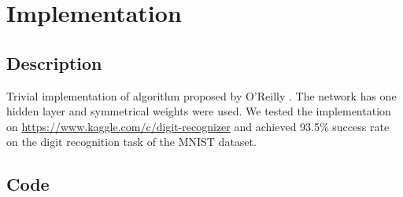 
\section{Implementation}

\subsection{Description}

Trivial implementation of algorithm proposed by O'Reilly \cite{o1996bio}. The network has one hidden layer and symmetrical weights were used. We tested the implementation on \url{https://www.kaggle.com/c/digit-recognizer} and achieved 93.5\% success rate on the digit recognition task of the MNIST dataset.

\subsection{Code}

